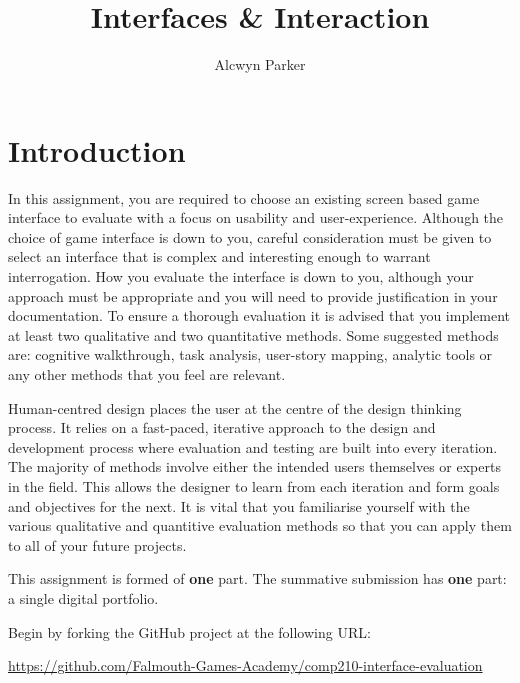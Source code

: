 \documentclass{../fal_assignment}
\title{Interfaces \& Interaction}
\author{Alcwyn Parker}
\begin{document}
\maketitle

\section*{Introduction}

In this assignment, you are required to choose an existing screen based game interface to evaluate with a focus on usability and user-experience. Although the choice of game interface is down to you, careful consideration must be given to select an interface that is complex and interesting enough to warrant interrogation. How you evaluate the interface is down to you, although your approach must be appropriate and you will need to provide justification in your documentation. To ensure a thorough evaluation it is advised that you implement at least two qualitative and two quantitative methods. Some suggested methods are: cognitive walkthrough, task analysis, user-story mapping, analytic tools or any other methods that you feel are relevant. 

Human-centred design places the user at the centre of the design thinking process. It relies on a fast-paced, iterative approach to the design and development process where evaluation and testing are built into every iteration. The majority of methods involve either the intended users themselves or experts in the field. This allows the designer to learn from each iteration and form goals and objectives for the next. It is vital that you familiarise yourself with the various qualitative and quantitive evaluation methods so that you can apply them to all of your future projects.  


This assignment is formed of \textbf{one} part.
The summative submission has \textbf{one} part: a single digital portfolio. 

Begin by forking the GitHub project at the following URL:
\begin{center}
\url{https://github.com/Falmouth-Games-Academy/comp210-interface-evaluation}
\end{center}
\end{document}

